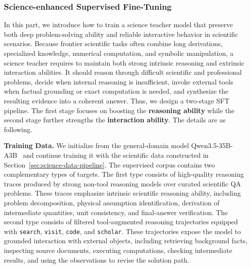 \documentclass{llmxive}
\begin{document}

\subsubsection{Science-enhanced Supervised Fine-Tuning}
In this part, we introduce how to train a science teacher model that preserve both deep problem-solving ability and reliable interactive behavior in scientific scenarios. Because frontier scientific tasks often combine long derivations, specialized knowledge, numerical computation, and symbolic manipulation, a science teacher requires to maintain both strong intrinsic reasoning and extrinsic interaction abilities. It should reason through difficult scientific and professional problems, decide when internal reasoning is insufficient, invoke external tools when factual grounding or exact computation is needed, and synthesize the resulting evidence into a coherent answer. Thus, we design a two-stage SFT pipeline. The first stage focuses on boosting the \textbf{reasoning ability} while the second stage further strengths the \textbf{interaction ability}. The details are as following. 

\textbf{Training Data.}
We initialize from the general-domain model Qwen3.5-35B-A3B~\citep{Qwen3.5} and continue training it with the scientific data constructed in Section~\ref{sec:science-data-pipeline}. The supervised corpus contains two complementary types of targets. The first type consists of high-quality reasoning traces produced by strong non-tool reasoning models over curated scientific QA problems. These traces emphasize intrinsic scientific reasoning ability, including problem decomposition, physical assumption identification, derivation of intermediate quantities, unit consistency, and final-answer verification. The second type consists of filtered tool-augmented reasoning trajectories equipped with \texttt{search}, \texttt{visit}, \texttt{code}, and \texttt{scholar}. These trajectories expose the model to grounded interaction with external objects, including retrieving background facts, inspecting source documents, executing computations, checking intermediate results, and using the observations to revise the solution path.
\end{document}
